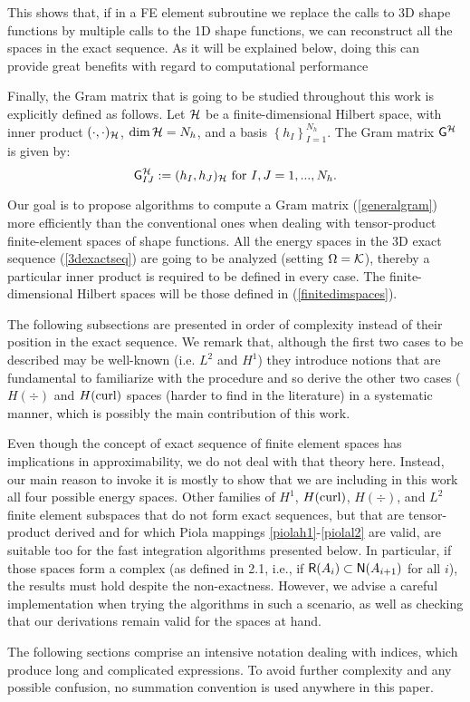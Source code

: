 This shows that, if in a FE element subroutine we replace the calls to 3D shape functions by multiple calls to the 1D shape functions, we can reconstruct all the spaces in the exact sequence. As it will be explained below, doing this can provide great benefits with regard to computational performance

Finally, the Gram matrix that is going to be studied throughout this work is explicitly defined as follows. Let $\mathcal{H}$ be a finite-dimensional Hilbert space, with inner product $(\cdot,\cdot)_{\mathcal{H}}$, $\operatorname*{dim}\mathcal{H}=N_h$, and a basis $\left\{h_I\right\}_{I=1}^{N_h}$. The Gram matrix $\mathsf{G}^{\mathcal{H}}$ is given by:
% 
\begin{equation}
    \mathsf{G}^{\mathcal{H}}_{IJ}:=(h_I,h_J)_{\mathcal{H}}\text{  for }I,J=1,...,N_h.
    \label{generalgram}
\end{equation}

Our goal is to propose algorithms to compute a Gram matrix (\ref{generalgram}) more efficiently than the conventional ones when dealing with tensor-product finite-element spaces of shape functions. All the energy spaces in the 3D exact sequence (\ref{3dexactseq}) are going to be analyzed (setting $\Omega=\mathcal{K}$), thereby a particular inner product is required to be defined in every case. The finite-dimensional Hilbert spaces will be those defined in (\ref{finitedimspaces}).

The following subsections are presented in order of complexity instead of their position in the exact sequence. We remark that, although the first two cases to be described may be well-known (i.e. $L^2$ and $H^1$) they introduce notions that are fundamental to familiarize with the procedure and so derive the other two cases ($H(\div)$ and $H(\operatorname{curl})$ spaces (harder to find in the literature) in a systematic manner, which is possibly the main contribution of this work.

{\color{red}\begin{remark}
    Even though the concept of exact sequence of finite element spaces has implications in approximability, we do not deal with that theory here. Instead, our main reason to invoke it is mostly to show that we are including in this work all four possible energy spaces. Other families of $H^1$, $H(\operatorname{curl})$, $H(\div)$, and $L^2$ finite element subspaces that do not form exact sequences, but that are tensor-product derived and for which Piola mappings \eqref{piolah1}-\eqref{piolal2} are valid, are suitable too for the fast integration algorithms presented below. In particular, if those spaces form a complex (as defined in 2.1, i.e., if  $\mathsf{R}(A_i)\subset\mathsf{N}(A_{i+1})$ for all $i$), the results must hold despite the non-exactness. However, we advise a careful implementation when trying the algorithms in such a scenario, as well as checking that our derivations remain valid for the spaces at hand.
\end{remark}}
{\color{blue}\begin{remark}
    The following sections comprise an intensive notation dealing with indices, which produce long and complicated expressions. To avoid further complexity and any possible confusion, no summation convention is used anywhere in this paper.
\end{remark}}

